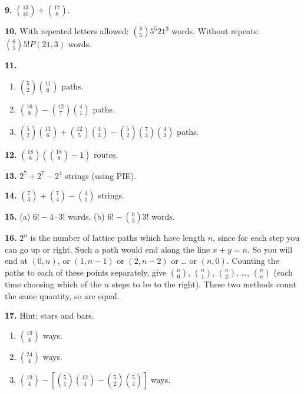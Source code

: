 \documentclass[10pt,]{book}
\theoremstyle{plain}
\theoremstyle{definition}
\theoremstyle{definition}
\theoremstyle{definition}
\numberwithin{equation}{chapter}
\begin{document}
\par\smallskip
\noindent\textbf{9.}\quad{}
            \({13 \choose 10} + {17 \choose 8}\).
\par\smallskip
\noindent\textbf{10.}\quad{}
            With repeated letters allowed: \({8 \choose 5}5^5 21^3\) words. Without repeats: \({8 \choose 5}5! P(21, 3)\) words.
\par\smallskip
\noindent\textbf{11.}\quad{}
            \leavevmode%
\begin{enumerate}[label=(\alph*)]
\item\hypertarget{li-744}{}\({5 \choose 2}{11 \choose 6}\) paths.%
\item\hypertarget{li-745}{}\({16 \choose 8} - {12 \choose 7}{4 \choose 1}\) paths.%
\item\hypertarget{li-746}{}\({5 \choose 2}{11 \choose 6} + {12 \choose 5}{4 \choose 3} - {5 \choose 2}{7 \choose 3}{4 \choose 3}\) paths.%
\end{enumerate}

\par\smallskip
\noindent\textbf{12.}\quad{}
            \({18 \choose 8}\left({18 \choose 8} - 1\right)\) routes.
\par\smallskip
\noindent\textbf{13.}\quad{}
            \(2^7 + 2^7 - 2^4\) strings (using PIE).
\par\smallskip
\noindent\textbf{14.}\quad{}
            \({7 \choose 3} + {7 \choose 4} - {4 \choose 1}\) strings.
\par\smallskip
\noindent\textbf{15.}\quad{}
            (a) \(6! - 4\cdot 3!\) words. (b) \(6! - {6 \choose 3}3!\) words.
\par\smallskip
\noindent\textbf{16.}\quad{}
            \(2^n\) is the number of lattice paths which have length \(n\), since for each step you can go up or right. Such a path would end along the line \(x + y = n\). So you will end at \((0,n)\), or \((1,n-1)\) or \((2, n-2)\) or
            \dots{} or \((n,0)\). Counting the paths to each of these points separately, give \({n \choose 0}\), \({n \choose 1}\), \({n \choose 2}\),
            \dots{}, \({n \choose n}\) (each time choosing which of the \(n\) steps to be to the right).  These two methods count the same quantity, so are equal.
\par\smallskip
\noindent\textbf{17.}\quad{}
            Hint: stars and bars.
          \leavevmode%
\begin{enumerate}[label=(\alph*)]
\item\hypertarget{li-750}{}\({19 \choose 4}\) ways.%
\item\hypertarget{li-751}{}\({24 \choose 4}\) ways.%
\item\hypertarget{li-752}{}\({19 \choose 4} - \left[{5 \choose 1}{12 \choose 4} - {5 \choose 2}{5 \choose 4}  \right]\) ways.%
\end{enumerate}
\end{document}
